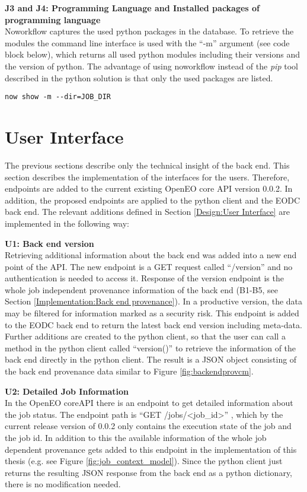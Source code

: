 \documentclass[draft,final]{vutinfth} %
\begin{document}
\textbf{J3 and J4: Programming Language and  Installed packages of programming language} \\
Noworkflow captures the used python packages in the database. To retrieve the modules the command line interface is used with the “-m” argument (see code block below), which returns all used python modules including their versions and the version of python. The advantage of using noworkflow instead of the \textit{pip} tool described in the python solution is that only the used packages are listed.

\begin{lstlisting}[frame=single]
now show -m --dir=JOB_DIR
\end{lstlisting}

\section{User Interface}\label{Implementation:User Interface}
The previous sections describe only the technical insight of the back end. This section describes the implementation of the interfaces for the users. Therefore, endpoints are added to the current existing OpenEO core API version 0.0.2. In addition, the proposed endpoints are applied to the python client and the EODC back end. The relevant additions defined in Section \ref{Design:User Interface} are implemented in the following way:

\textbf{U1: Back end version} \\
Retrieving additional information about the back end was added into a new end point of the API. The new endpoint is a GET request called “/version” and no authentication is needed to access it. Response of the version endpoint is the whole job independent provenance information of the back end (B1-B5, see Section \ref{Implementation:Back end provenance}). In a productive version, the data may be filtered for information marked as a security risk. This endpoint is added to the EODC back end to return the latest back end version including meta-data. Further additions are created to the python client, so that the user can call a method in the python client called “version()” to retrieve the information of the back end directly in the python client. The result is a JSON object consisting of the back end provenance data similar to Figure \ref{fig:backendprovcm}.

\textbf{U2: Detailed Job Information} \\
In the OpenEO coreAPI there is an endpoint to get detailed information about the job status. The endpoint path is “GET /jobs/<job\_id>” , which by the current release version of 0.0.2 only contains the execution state of the job and the job id. In addition to this the available information of the whole job dependent provenance gets added to this endpoint in the implementation of this thesis (e.g. see Figure \ref{fig:job_context_model}). Since the python client just returns the resulting JSON response from the back end as a python dictionary, there is no modification needed.
\end{document}
